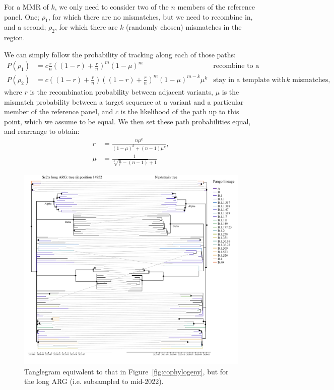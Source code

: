 \documentclass{article}
\begin{document}
For a MMR of $k$, we only need to consider two of the $n$ members of the reference panel. One; $\rho_1$, for which there are no mismatches, but we need to recombine in, and a second; $\rho_2$, for which there are $k$ (randomly chosen) mismatches in the region.

We can simply follow the probability of tracking along each of those paths:
\begin{align*}
P(\rho_1) &= c \frac{r}{n} \left(\left(1-r\right)+\frac{r}{n}\right)^m\left(1-\mu\right)^m &\text{recombine to a template with no mismatches,}\\
P(\rho_2) &= c \left(\left(1-r\right) + \frac{r}{n}\right)\left(\left(1-r\right)+\frac{r}{n}\right)^m \left(1-\mu\right)^{m-k}\mu^k &\text{stay in a template with $k$ mismatches,}
\end{align*}
where $r$ is the recombination probability between adjacent variants, $\mu$ is the mismatch probability between a target sequence at a variant and a particular member of the reference panel, and $c$ is the likelihood of the path up to this point, which we assume to be equal.
We then set these path probabilities equal, and rearrange to obtain:
\begin{align*}
r &= \frac{n\mu^k}{\left(1-\mu\right)^k + \left(n-1\right)\mu^k},\\
\mu &= \frac{1}{\sqrt[k]{\frac{n}{r} - (n-1)} + 1}
\end{align*}

\begin{figure} \centering
\includegraphics[width=\textwidth]{figures/supp_cophylogeny_long.pdf}
\caption{\label{fig:cophylogeny_long}Tanglegram equivalent to that in Figure~\ref{fig:cophylogeny}, but for the long ARG (i.e. subsampled to mid-2022). }
\end{figure}
\end{document}
